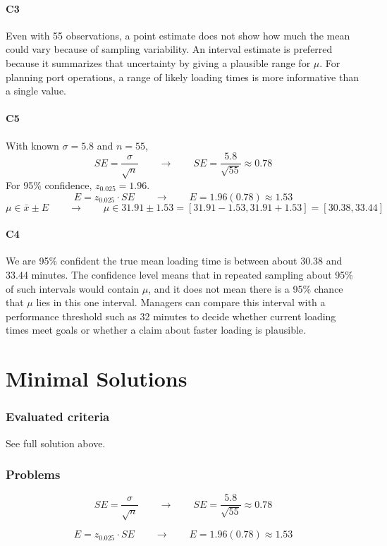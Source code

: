 \begin{ExamProblems}
		\subsection*{C3}
		Even with 55 observations, a point estimate does not show how much the mean could vary because of sampling variability. An interval estimate is preferred because it summarizes that uncertainty by giving a plausible range for $\mu$. For planning port operations, a range of likely loading times is more informative than a single value.

		\subsection*{C5}
		With known $\sigma = 5.8$ and $n=55$,
		\[
		SE = \frac{\sigma}{\sqrt{n}} \qquad \longrightarrow \qquad SE = \frac{5.8}{\sqrt{55}} \approx 0.78
		\]
		For 95\% confidence, $z_{0.025}=1.96$.
		\[
		E = z_{0.025} \cdot SE \qquad \longrightarrow \qquad E = 1.96(0.78) \approx 1.53
		\]
		\[
		\mu \in \bar{x} \pm E \qquad \longrightarrow \qquad \mu \in 31.91 \pm 1.53 = [31.91 - 1.53, 31.91 + 1.53] = [30.38, 33.44]
		\]

		\subsection*{C4}
		We are 95\% confident the true mean loading time is between about 30.38 and 33.44 minutes. The confidence level means that in repeated sampling about 95\% of such intervals would contain $\mu$, and it does not mean there is a 95\% chance that $\mu$ lies in this one interval. Managers can compare this interval with a performance threshold such as 32 minutes to decide whether current loading times meet goals or whether a claim about faster loading is plausible.
	\end{ExamProblems}


\part{Minimal Solutions}

\section*{Evaluated criteria}
See full solution above.

\section*{Problems}
\[SE = \frac{\sigma}{\sqrt{n}} \qquad \longrightarrow \qquad SE = \frac{5.8}{\sqrt{55}} \approx 0.78\]

\[E = z_{0.025} \cdot SE \qquad \longrightarrow \qquad E = 1.96(0.78) \approx 1.53\]


